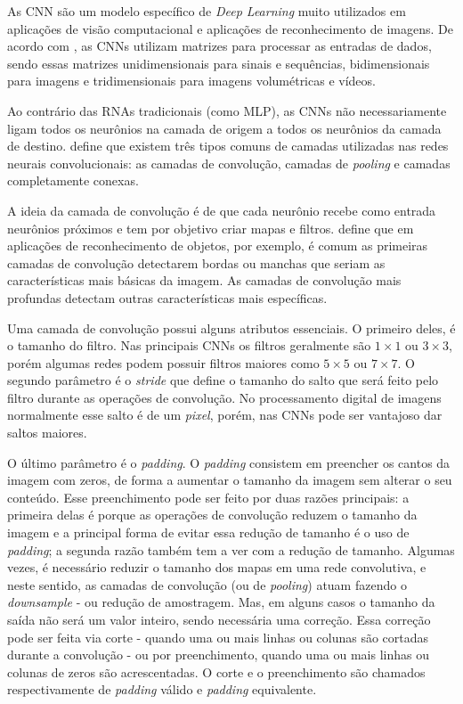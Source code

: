 As \ac{CNN} são um modelo específico de \textit{Deep Learning} muito utilizados em aplicações de visão computacional e aplicações de reconhecimento de imagens. De acordo com , as \ac{CNN}s utilizam matrizes para processar as entradas de dados, sendo essas matrizes unidimensionais para sinais e sequências, bidimensionais para imagens e tridimensionais para imagens volumétricas e vídeos. 

Ao contrário das \ac{RNA}s tradicionais (como \ac{MLP}), as \ac{CNN}s não necessariamente ligam todos os neurônios na camada de origem a todos os neurônios da camada de destino.  define que existem três tipos comuns de camadas utilizadas nas redes neurais convolucionais: as camadas de convolução, camadas de \textit{pooling} e camadas completamente conexas.

A ideia da camada de convolução é de que cada neurônio recebe como entrada neurônios próximos e tem por objetivo criar mapas e filtros.  define que em aplicações de reconhecimento de objetos, por exemplo, é comum as primeiras camadas de convolução detectarem bordas ou manchas que seriam as características mais básicas da imagem. As camadas de convolução mais profundas detectam outras características mais específicas.

Uma camada de convolução possui alguns atributos essenciais. O primeiro deles, é o tamanho do filtro. Nas principais \ac{CNN}s os filtros geralmente são $1 \times 1$ ou $3 \times 3$, porém algumas redes podem possuir filtros maiores como $5 \times 5$ ou $7 \times 7$. O segundo parâmetro é o \textit{stride} que define o tamanho do salto que será feito pelo filtro durante as operações de convolução. No processamento digital de imagens normalmente esse salto é de um \textit{pixel}, porém, nas \ac{CNN}s pode ser vantajoso dar saltos maiores. 

O último parâmetro é o \textit{padding}. O \textit{padding} consistem em preencher os cantos da imagem com zeros, de forma a aumentar o tamanho da imagem sem alterar o seu conteúdo. Esse preenchimento pode ser feito por duas razões principais: a primeira delas é porque as operações de convolução reduzem o tamanho da imagem e a principal forma de evitar essa redução de tamanho é o uso de \textit{padding}; a segunda razão também tem a ver com a redução de tamanho. Algumas vezes, é necessário reduzir o tamanho dos mapas em uma rede convolutiva, e neste sentido, as camadas de convolução (ou de \textit{pooling}) atuam fazendo o \textit{downsample} - ou redução de amostragem. Mas, em alguns casos o tamanho da saída não será um valor inteiro, sendo necessária uma correção. Essa correção pode ser feita via corte - quando uma ou mais linhas ou colunas são cortadas durante a convolução - ou por preenchimento, quando uma ou mais linhas ou colunas de zeros são acrescentadas. O corte e o preenchimento são chamados respectivamente de \textit{padding} válido e \textit{padding} equivalente. 

